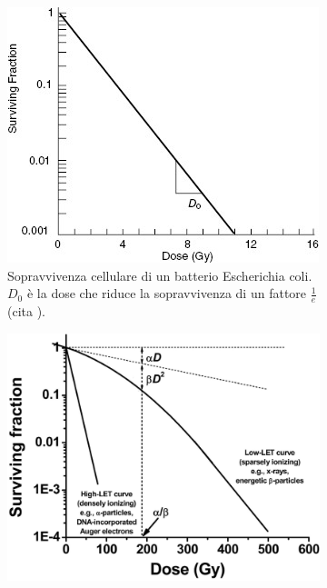 \documentclass[12pt,a4paper,twoside]{report}
\begin{document}
	\begin{figure}[H]
		\centering
		\begin{subfigure}[t]{0.49\textwidth}
			\centering
			\includegraphics[width=\textwidth, scale=0.50]{images/survival1.jpg}
			\caption{Sopravvivenza cellulare di un batterio Escherichia coli. $D_0$ è la dose che riduce la sopravvivenza di un fattore $\frac{1}{e}$ (cita
				).}
			\label{fig:survival1}
		\end{subfigure}
		\hfill
		\begin{subfigure}[t]{0.49\textwidth}
			\centering
			\includegraphics[width=\textwidth, scale=0.50]{images/survival2.png}

\end{subfigure}
\end{figure}
\end{document}
